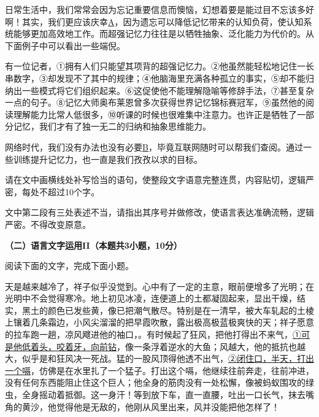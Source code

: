 \documentclass{exam-zh}
\newcommand{\dotemph}[1]{\CJKunderdot{#1}}
\begin{document}
\begin{material}
    日常生活中，我们常常会因为忘记重要信息而懊恼，幻想着要是能过目不忘该多好啊！其实，我们更应该庆幸\uline{\hspace{2em}A\hspace{2em}}，因为遗忘可以降低记忆带来的认知负荷，使认知系统能够更加高效地工作。而超强记忆力往往是以牺牲抽象、泛化能力为代价的。从下面例子中可以看出一些端倪。\par
    有一位记者，①拥有人们只能望其项背的超强记忆力。②他虽然能轻松地记住一长串数字，③却发现不了其中的规律；④他脑海里充满各种孤立的事实，⑤却不能归纳出一些模式将它们组织起来。⑥这促使他不能理解隐喻等修辞手法，⑦甚至复杂一点的句子。⑧记忆大师奥布莱恩曾多次获得世界记忆锦标赛冠军，⑨虽然他的阅读理解能力比常人低很多，⑩听课的时候也很难集中注意力。也许正是牺牲了一部分记忆，我们才有了独一无二的归纳和抽象思维能力。\par
    网络时代，我们没有办法也没有必要\uline{\hspace{2em}B\hspace{2em}}，毕竟互联网随时可以帮我们查阅。通过一些训练提升记忆力，也一直是我们孜孜以求的目标。

\end{material}

\begin{question}[points=5]
    请在文中画横线处补写恰当的语句，使整段文字语意完整连贯，内容贴切，逻辑严密，每处不超过10个字。
\end{question}

\begin{question}[points=5]
    文中第二段有三处表述不当，请指出其序号并做修改，使语言表达准确流畅，逻辑严密。不得改变原意。
\end{question}

{\bfseries（二）语言文字运用II（本题共3小题，10分）}

阅读下面的文字，完成下面小题。
\begin{material}
    天是越来越冷了，祥子似乎没觉到。心中有了一定的主意，眼前便增多了光明；在光明中不会觉得寒冷。地上初见冰凌，连便道上的土都凝固起来，\dotemph{处处}显出干燥，结实，黑土的颜色已\dotemph{微微}发些黄，像已把潮气散尽。特别是在一清早，被大车轧起的土棱上镶着几条霜边，小风尖溜溜的把早霞吹散，露出极高极蓝极爽快的天；祥子愿意\dotemph{早早}的拉车跑一趟，凉风飕进他的袖口，。有时候起了狂风，把他打得出不来气，\uline{①可是他低着头，咬着牙，向前钻}，像一条浮着逆水的大鱼；风越大，他的抵抗也越大，似乎是和狂风决一死战。猛的一股风顶得他透不出气，\uline{②闭住口，半天，打出一个嗝}，仿佛是在水里扎了一个猛子。打出这个嗝，他继续往前奔走，往前冲进，没有任何东西能阻止住这个巨人；他全身的筋肉没有一处松懈，像被蚂蚁围攻的绿虫，全身摇动着抵御。这一身汗！等到放下车，直一直腰，吐出一口长气，抹去嘴角的黄沙，他觉得他是无敌的，他刚从风里出来，风并没能把他怎样了！
\end{material}
\end{document}
